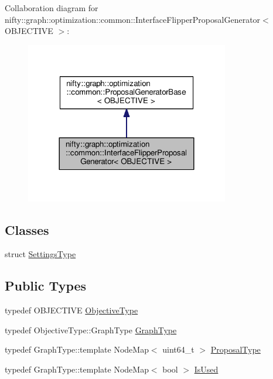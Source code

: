 Collaboration diagram for nifty\+:\+:graph\+:\+:optimization\+:\+:common\+:\+:Interface\+Flipper\+Proposal\+Generator$<$ O\+B\+J\+E\+C\+T\+I\+V\+E $>$\+:\nopagebreak
\begin{figure}[H]
\begin{center}
\leavevmode
\includegraphics[width=252pt]{classnifty_1_1graph_1_1optimization_1_1common_1_1InterfaceFlipperProposalGenerator__coll__graph}
\end{center}
\end{figure}
\subsection*{Classes}
\begin{DoxyCompactItemize}
\item 
struct \hyperlink{structnifty_1_1graph_1_1optimization_1_1common_1_1InterfaceFlipperProposalGenerator_1_1SettingsType}{Settings\+Type}
\end{DoxyCompactItemize}
\subsection*{Public Types}
\begin{DoxyCompactItemize}
\item 
typedef O\+B\+J\+E\+C\+T\+I\+V\+E \hyperlink{classnifty_1_1graph_1_1optimization_1_1common_1_1InterfaceFlipperProposalGenerator_a23d9dca49c7acc58fc6ed4d877ccdfd9}{Objective\+Type}
\item 
typedef Objective\+Type\+::\+Graph\+Type \hyperlink{classnifty_1_1graph_1_1optimization_1_1common_1_1InterfaceFlipperProposalGenerator_a6120165915da23c962ef5dd56a055818}{Graph\+Type}
\item 
typedef Graph\+Type\+::template Node\+Map$<$ uint64\+\_\+t $>$ \hyperlink{classnifty_1_1graph_1_1optimization_1_1common_1_1InterfaceFlipperProposalGenerator_af96c4895cbdc98e624cbece6e15816e1}{Proposal\+Type}
\item 
typedef Graph\+Type\+::template Node\+Map$<$ bool $>$ \hyperlink{classnifty_1_1graph_1_1optimization_1_1common_1_1InterfaceFlipperProposalGenerator_a85bf392f7e8524757dd9491344025f3e}{Is\+Used}
\end{DoxyCompactItemize}
